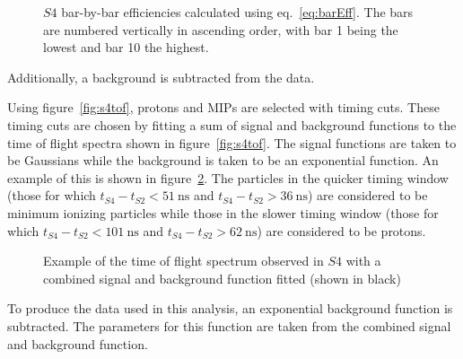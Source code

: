 \begin{figure}[h]
  \centering
  \begin{adjustbox}{max totalsize={.8\textwidth}{.5\textheight},center}
    
  \end{adjustbox}
  \caption{$\mathit{S4}$ bar-by-bar efficiencies calculated using eq.~\ref{eq:barEff}. The bars are numbered vertically in ascending order, with bar 1 being the lowest and bar 10 the highest.}
  \label{fig:s4Eff}
\end{figure}

Additionally, a background is subtracted from the data. %

Using figure~\ref{fig:s4tof}, protons and MIPs are selected with timing cuts. 
These timing cuts are chosen by fitting a sum of signal and background functions to the time of flight spectra shown in figure~\ref{fig:s4tof}. 
The signal functions are taken to be Gaussians while the background is taken to be an exponential function. 
An example of this is shown in figure~\ref{fig:fitEx}.
The particles in the quicker timing window (those for which $t_{\mathit{S4}}-t_{\mathit{S2}}<51~\text{ns}$ and $t_{\mathit{S4}}-t_{\mathit{S2}}>36~\text{ns}$) are considered to be minimum ionizing particles while those in the slower timing window (those for which $t_{\mathit{S4}}-t_{\mathit{S2}}<101~\text{ns}$ and $t_{\mathit{S4}}-t_{\mathit{S2}}>62~\text{ns}$) are considered to be protons.

\begin{figure}[h]
  \begin{adjustbox}{max totalsize={.7\textwidth}{.62\textheight},center}
    
  \end{adjustbox}
  \caption{Example of the time of flight spectrum observed in $\mathit{S4}$ with a combined signal and background function fitted (shown in black)}
  \label{fig:fitEx}
\end{figure}

To produce the data used in this analysis, an exponential background function is subtracted. 
The parameters for this function are taken from the combined signal and background function.


